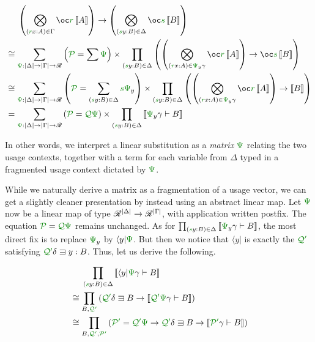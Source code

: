 \begin{align*}
  &\phantom{{}={}}
    \left(\bigotimes_{(\gr rx : A) \in \Gamma}\oc \gr r\sem A\right) \to
    \left(\bigotimes_{(\gr sy : B) \in \Delta}\oc \gr s\sem B\right) \\
  &\cong \sum_{\gr\Psi : \size\Delta \to \size\Gamma \to \Ann}
    \left(\grP = \sum\gr\Psi\right) \times
    \prod_{(\gr sy : B) \in \Delta}\left(
    \left(\bigotimes_{(\gr rx : A) \in \gr\Psi_y\gamma}\oc \gr r\sem A\right)
    \to \oc \gr s\sem B
    \right) \\
  &\cong \sum_{\gr\Psi : \size\Delta \to \size\Gamma \to \Ann}
    \left(\grP = \sum_{(\gr sy : B) \in \Delta}\gr s\gr\Psi_y\right) \times
    \prod_{(\gr sy : B) \in \Delta}\left(
    \left(\bigotimes_{(\gr rx : A) \in \gr\Psi_y\gamma}\oc \gr r\sem A\right)
    \to \sem B
    \right) \\
  &= \sum_{\gr\Psi : \size\Delta \to \size\Gamma \to \Ann}
    \left(\grP = \grQ\gr\Psi\right) \times
    \prod_{(\gr sy : B) \in \Delta} \sem{\gr\Psi_y\gamma \vdash B}
\end{align*}

In other words, we interpret a linear substitution as a \emph{matrix}
$\gr\Psi$ relating the two usage contexts, together with a term for each
variable from $\Delta$ typed in a fragmented usage context dictated by
$\gr\Psi$.

While we naturally derive a matrix as a fragmentation of a usage vector, we can
get a slightly cleaner presentation by instead using an abstract linear map.
Let $\gr\Psi$ now be a linear map of type
$\mathscr R^{\left\lvert{\Delta}\right\rvert} \to \mathscr R^{\left\lvert{\Gamma}\right\rvert}$, with application written postfix.
The equation $\grP = \grQ\gr\Psi$ remains unchanged.
As for $\prod_{(\gr sy : B) \in \Delta}\sem{\gr\Psi_y\gamma \vdash B}$, the most
direct fix is to replace $\gr\Psi_y$ by $\langle y \rvert\gr\Psi$.
But then we notice that $\langle y \rvert$ is exactly the $\grQprime$ satisfying
$\grQprime\delta \sqni y : B$.
Thus, let us derive the following.

\begin{align*}
  &\phantom{{}={}} \prod_{(\gr sy : B) \in \Delta}
    \sem{\langle y \rvert \gr\Psi\gamma \vdash B} \\
  &\cong \prod_{B,\grQprime} \left(\grQprime\delta \sqni B \to
    \sem{\grQprime\gr\Psi\gamma \vdash B}\right) \\
  &\cong \prod_{B,\grQprime,\grPprime} \left(
    \grPprime = \grQprime\gr\Psi \to \grQprime\delta \sqni B \to
    \sem{\grPprime\gamma \vdash B}\right)
\end{align*}

